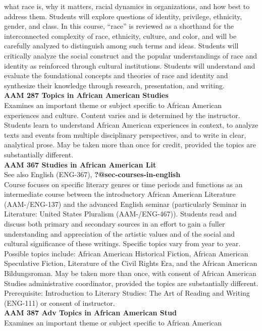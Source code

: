 \documentclass[
  letterpaper,
]{scrbook}
\begin{document}
what race is, why it matters, racial dynamics in organizations, and how
best to address them. Students will explore questions of identity,
privilege, ethnicity, gender, and class. In this course, ``race'' is
reviewed as a shorthand for the interconnected complexity of race,
ethnicity, culture, and color, and will be carefully analyzed to
distinguish among such terms and ideas. Students will critically analyze
the social construct and the popular understandings of race and identity
as reinforced through cultural institutions. Students will understand
and evaluate the foundational concepts and theories of race and identity
and synthesize their knowledge through research, presentation, and
writing.\\
\textbf{AAM 287 Topics in African American Studies}\\
Examines an important theme or subject specific to African American
experiences and culture. Content varies and is determined by the
instructor. Students learn to understand African American experiences in
context, to analyze texts and events from multiple disciplinary
perspectives, and to write in clear, analytical prose. May be taken more
than once for credit, provided the topics are substantially different.\\
\textbf{AAM 367 Studies in African American Lit}\\
See also English (ENG-367), \textbf{?@sec-courses-in-english}\\
Course focuses on specific literary genres or time periods and functions
as an intermediate course between the introductory African American
Literature (AAM-/ENG-137) and the advanced English seminar (particularly
Seminar in Literature: United States Pluralism (AAM-/ENG-467)). Students
read and discuss both primary and secondary sources in an effort to gain
a fuller understanding and appreciation of the artistic values and of
the social and cultural significance of these writings. Specific topics
vary from year to year. Possible topics include: African American
Historical Fiction, African American Speculative Fiction, Literature of
the Civil Rights Era, and the African American Bildungsroman. May be
taken more than once, with consent of African American Studies
administrative coordinator, provided the topics are substantially
different. Prerequisite: Introduction to Literary Studies: The Art of
Reading and Writing (ENG-111) or consent of instructor.\\
\textbf{AAM 387 Adv Topics in African American Stud}\\
Examines an important theme or subject specific to African American
\end{document}
